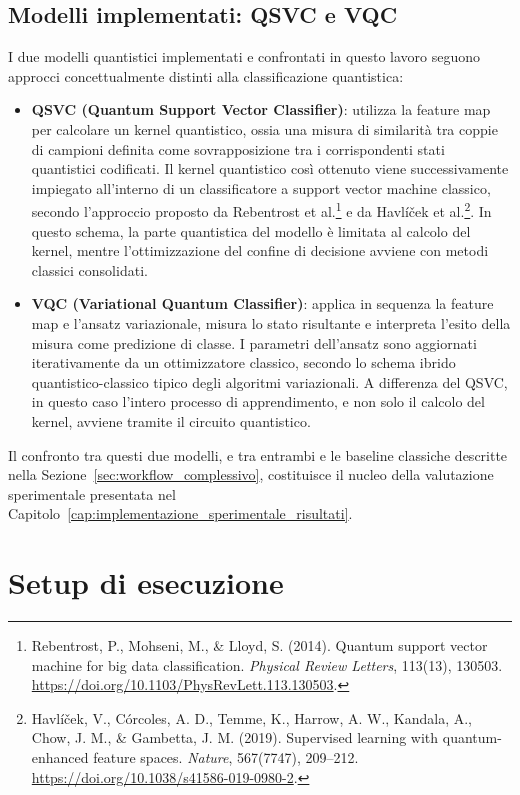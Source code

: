 \subsection{Modelli implementati: QSVC e VQC}
I due modelli quantistici implementati e confrontati in questo lavoro seguono approcci concettualmente distinti alla classificazione quantistica:

\begin{itemize}
    \item \textbf{QSVC (Quantum Support Vector Classifier)}: utilizza la feature map per calcolare un kernel quantistico, ossia una misura di similarità tra coppie di campioni definita come sovrapposizione tra i corrispondenti stati quantistici codificati. Il kernel quantistico così ottenuto viene successivamente impiegato all'interno di un classificatore a support vector machine classico, secondo l'approccio proposto da Rebentrost et al.\footnote{Rebentrost, P., Mohseni, M., \& Lloyd, S. (2014). Quantum support vector machine for big data classification. \textit{Physical Review Letters}, 113(13), 130503. \url{https://doi.org/10.1103/PhysRevLett.113.130503}.} e da Havlíček et al.\footnote{Havlíček, V., Córcoles, A. D., Temme, K., Harrow, A. W., Kandala, A., Chow, J. M., \& Gambetta, J. M. (2019). Supervised learning with quantum-enhanced feature spaces. \textit{Nature}, 567(7747), 209--212. \url{https://doi.org/10.1038/s41586-019-0980-2}.}. In questo schema, la parte quantistica del modello è limitata al calcolo del kernel, mentre l'ottimizzazione del confine di decisione avviene con metodi classici consolidati.
    \item \textbf{VQC (Variational Quantum Classifier)}: applica in sequenza la feature map e l'ansatz variazionale, misura lo stato risultante e interpreta l'esito della misura come predizione di classe. I parametri dell'ansatz sono aggiornati iterativamente da un ottimizzatore classico, secondo lo schema ibrido quantistico-classico tipico degli algoritmi variazionali. A differenza del QSVC, in questo caso l'intero processo di apprendimento, e non solo il calcolo del kernel, avviene tramite il circuito quantistico.
\end{itemize}

Il confronto tra questi due modelli, e tra entrambi e le baseline classiche descritte nella Sezione~\ref{sec:workflow_complessivo}, costituisce il nucleo della valutazione sperimentale presentata nel Capitolo~\ref{cap:implementazione_sperimentale_risultati}.

\section{Setup di esecuzione}
\label{sec:setup_esecuzione}

